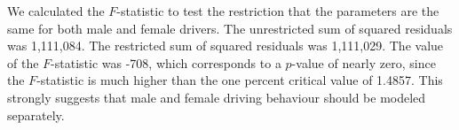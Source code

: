 



We calculated the $F$-statistic to test the restriction 
that the parameters are the same for both male and female drivers. 
The unrestricted sum of squared residuals was 1,111,084. 
The restricted sum of squared residuals was 1,111,029. 
The value of the $F$-statistic was -708, 
which corresponds to a $p$-value of nearly zero, since the $F$-statistic is much higher than 
 the one percent critical value of 1.4857. 
This strongly suggests that male and female driving behaviour should be modeled separately. 
